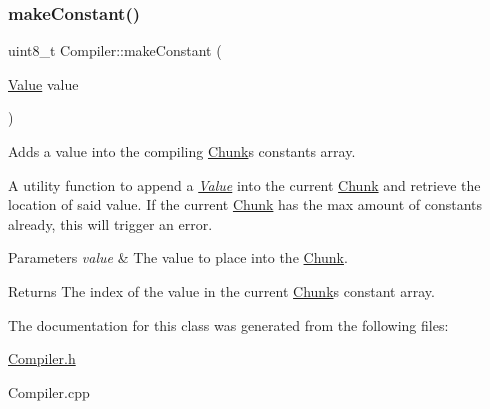 \subsubsection{\texorpdfstring{make\+Constant()}{makeConstant()}}
{\footnotesize\ttfamily uint8\+\_\+t Compiler\+::make\+Constant (\begin{DoxyParamCaption}\item[{\hyperlink{class_value}{Value}}]{value }\end{DoxyParamCaption})\hspace{0.3cm}{\ttfamily [private]}}



Adds a value into the compiling \hyperlink{class_chunk}{Chunk}\textquotesingle{}s constants array. 

A utility function to append a {\itshape \hyperlink{class_value}{Value}} into the current \hyperlink{class_chunk}{Chunk} and retrieve the location of said value. If the current \hyperlink{class_chunk}{Chunk} has the max amount of constants already, this will trigger an error. 
\begin{DoxyParams}{Parameters}
{\em value} & The value to place into the \hyperlink{class_chunk}{Chunk}. \\
\hline
\end{DoxyParams}
\begin{DoxyReturn}{Returns}
The index of the value in the current \hyperlink{class_chunk}{Chunk}\textquotesingle{}s constant array. 
\end{DoxyReturn}


The documentation for this class was generated from the following files\+:\begin{DoxyCompactItemize}
\item 
\hyperlink{_compiler_8h}{Compiler.\+h}\item 
Compiler.\+cpp\end{DoxyCompactItemize}
